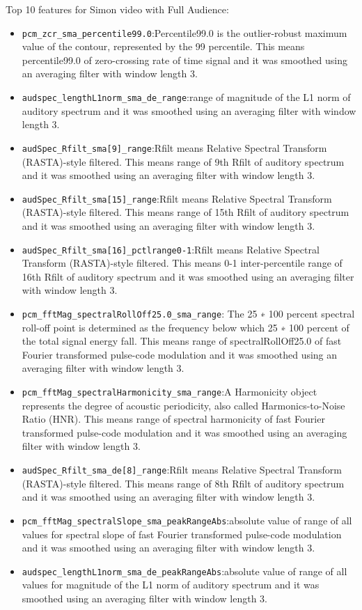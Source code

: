 Top 10 features for Simon video with Full Audience:
\begin{itemize}
\item \verb|pcm_zcr_sma_percentile99.0|:Percentile99.0 is the outlier-robust maximum value of the contour, represented by the 99 percentile. This means percentile99.0 of zero-crossing rate of time signal and it was smoothed using an averaging filter with window length 3.
\item \verb|audspec_lengthL1norm_sma_de_range|:range of magnitude of the L1 norm of auditory spectrum and it was smoothed using an averaging filter with window length 3.
\item \verb|audSpec_Rfilt_sma[9]_range|:Rfilt means Relative Spectral Transform (RASTA)-style filtered. This means range of 9th Rfilt of auditory spectrum and it was smoothed using an averaging filter with window length 3.
\item \verb|audSpec_Rfilt_sma[15]_range|:Rfilt means Relative Spectral Transform (RASTA)-style filtered. This means range of 15th Rfilt of auditory spectrum and it was smoothed using an averaging filter with window length 3.
\item \verb|audSpec_Rfilt_sma[16]_pctlrange0-1|:Rfilt means Relative Spectral Transform (RASTA)-style filtered. This means 0-1 inter-percentile range of 16th Rfilt of auditory spectrum and it was smoothed using an averaging filter with window length 3.
\item \verb|pcm_fftMag_spectralRollOff25.0_sma_range|: The 25 ∗ 100 percent spectral roll-off point is determined as the frequency below which 25 ∗ 100 percent of the total signal energy fall. This means range of spectralRollOff25.0 of fast Fourier transformed pulse-code modulation and it was smoothed using an averaging filter with window length 3.
\item \verb|pcm_fftMag_spectralHarmonicity_sma_range|:A Harmonicity object represents the degree of acoustic periodicity, also called Harmonics-to-Noise Ratio (HNR). This means range of spectral harmonicity of fast Fourier transformed pulse-code modulation and it was smoothed using an averaging filter with window length 3.
\item \verb|audSpec_Rfilt_sma_de[8]_range|:Rfilt means Relative Spectral Transform (RASTA)-style filtered. This means range of 8th Rfilt of auditory spectrum and it was smoothed using an averaging filter with window length 3.
\item \verb|pcm_fftMag_spectralSlope_sma_peakRangeAbs|:absolute value of range of all values for spectral slope of fast Fourier transformed pulse-code modulation and it was smoothed using an averaging filter with window length 3.
\item \verb|audspec_lengthL1norm_sma_de_peakRangeAbs|:absolute value of range of all values for magnitude of the L1 norm of auditory spectrum and it was smoothed using an averaging filter with window length 3.
\end{itemize}

